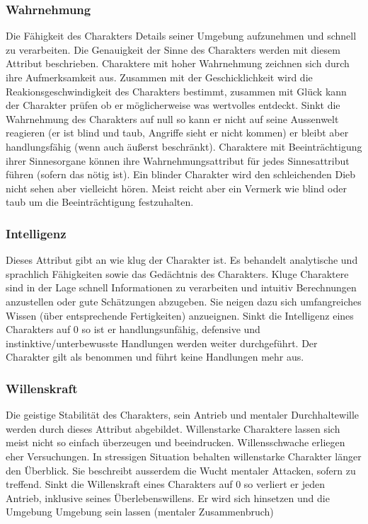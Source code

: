 \documentclass{article}
\begin{document}
\subsubsection{Wahrnehmung}

Die Fähigkeit des Charakters Details seiner Umgebung aufzunehmen und schnell zu verarbeiten. Die Genauigkeit der
Sinne des Charakters werden mit diesem Attribut beschrieben. Charaktere mit hoher Wahrnehmung zeichnen sich durch
ihre Aufmerksamkeit aus. Zusammen mit der Geschicklichkeit wird die Reakionsgeschwindigkeit des Charakters bestimmt,
zusammen mit Glück kann der Charakter prüfen ob er möglicherweise was wertvolles entdeckt. Sinkt die Wahrnehmung des
Charakters auf null so kann er nicht auf seine Aussenwelt reagieren (er ist blind und taub, Angriffe sieht er nicht
kommen) er bleibt aber handlungsfähig (wenn auch äußerst beschränkt). Charaktere mit Beeinträchtigung ihrer
Sinnesorgane können ihre Wahrnehmungsattribut für jedes Sinnesattribut führen (sofern das nötig ist). Ein blinder
Charakter wird den schleichenden Dieb nicht sehen aber vielleicht hören. Meist reicht aber ein Vermerk wie blind
oder taub um die Beeinträchtigung festzuhalten.

\subsubsection{Intelligenz}

Dieses Attribut gibt an wie klug der Charakter ist. Es behandelt analytische und sprachlich Fähigkeiten sowie das
Gedächtnis des Charakters. Kluge Charaktere sind in der Lage schnell Informationen zu verarbeiten und intuitiv
Berechnungen anzustellen oder gute Schätzungen abzugeben. Sie neigen dazu sich umfangreiches Wissen (über entsprechende
Fertigkeiten) anzueignen. Sinkt die Intelligenz eines Charakters auf 0 so ist er handlungsunfähig, defensive und
instinktive/unterbewusste Handlungen werden weiter durchgeführt. Der Charakter gilt als benommen und führt keine
Handlungen mehr aus.

\subsubsection{Willenskraft}

Die geistige Stabilität des Charakters, sein Antrieb und mentaler Durchhaltewille werden durch dieses Attribut
abgebildet. Willenstarke Charaktere lassen sich meist nicht so einfach überzeugen und beeindrucken. Willensschwache
erliegen eher Versuchungen. In stressigen Situation behalten willenstarke Charakter länger den Überblick. Sie
beschreibt ausserdem die Wucht mentaler Attacken, sofern zu treffend. Sinkt die Willenskraft eines Charakters auf 0
so verliert er jeden Antrieb, inklusive seines Überlebenswillens. Er wird sich hinsetzen und die Umgebung Umgebung
sein lassen (mentaler Zusammenbruch)
\end{document}
